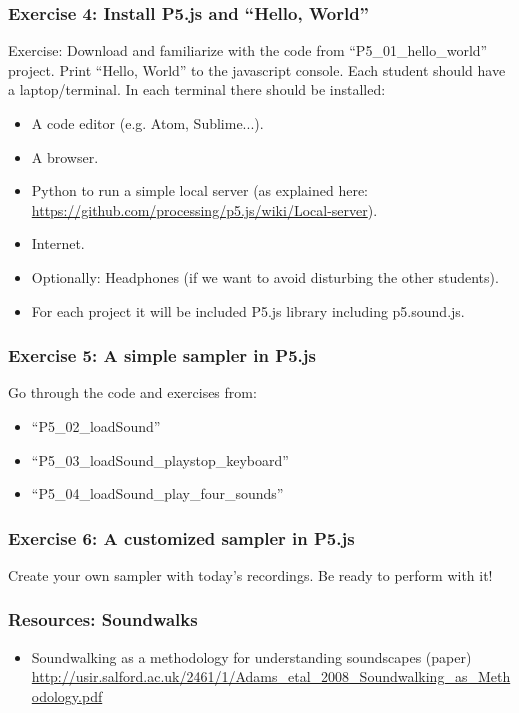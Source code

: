 \documentclass[screen, aspectratio=43]{beamer}
\begin{document}
%
\begin{frame}
  \frametitle{Exercise 4: Install P5.js and ``Hello, World''}
 Exercise: Download and familiarize with the code from ``P5\_01\_hello\_world'' project. Print ``Hello, World'' to the javascript console.
 Each student should have a laptop/terminal. In each terminal there should be installed:
    \begin{itemize}
	\item A code editor (e.g. Atom, Sublime...).
	\item A browser.
	\item Python to run a simple local server (as explained here: \url{https://github.com/processing/p5.js/wiki/Local-server}).
	\item Internet.
	\item Optionally: Headphones (if we want to avoid disturbing the other students).
	\item For each project it will be included P5.js library including p5.sound.js.
    \end{itemize}
\end{frame}
%
\begin{frame}
  \frametitle{Exercise 5: A simple sampler in P5.js}
  Go through the code and exercises from: 
   \begin{itemize}
  	\item ``P5\_02\_loadSound''
	\item ``P5\_03\_loadSound\_playstop\_keyboard'' 
	\item ``P5\_04\_loadSound\_play\_four\_sounds''
   \end{itemize}
  
  
\end{frame}
%
\begin{frame}
  \frametitle{Exercise 6: A customized sampler in P5.js}
  Create your own sampler with today's recordings. Be ready to perform with it!
\end{frame}
%
\begin{frame}
  \frametitle{Resources: Soundwalks}
    \begin{itemize}
	\item Soundwalking as a methodology for understanding soundscapes (paper)\\ 
	\url{http://usir.salford.ac.uk/2461/1/Adams_etal_2008_Soundwalking_as_Methodology.pdf}
    \end{itemize}    
\end{frame}
%
\end{document}
